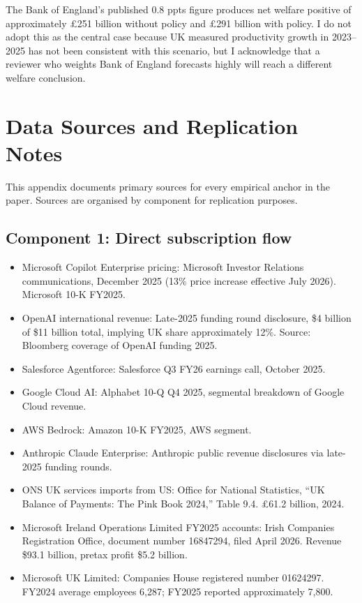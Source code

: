\documentclass[11pt,letterpaper]{article}
\theoremstyle{remark}
\begin{document}
The Bank of England's published 0.8 ppts figure produces net welfare positive of approximately \pounds251 billion without policy and \pounds291 billion with policy. I do not adopt this as the central case because UK measured productivity growth in 2023--2025 has not been consistent with this scenario, but I acknowledge that a reviewer who weights Bank of England forecasts highly will reach a different welfare conclusion.

\section{Data Sources and Replication Notes}

This appendix documents primary sources for every empirical anchor in the paper. Sources are organised by component for replication purposes.

\subsection{Component 1: Direct subscription flow}

\begin{itemize}
\item Microsoft Copilot Enterprise pricing: Microsoft Investor Relations communications, December 2025 (13\% price increase effective July 2026). Microsoft 10-K FY2025.
\item OpenAI international revenue: Late-2025 funding round disclosure, \$4 billion of \$11 billion total, implying UK share approximately 12\%. Source: Bloomberg coverage of OpenAI funding 2025.
\item Salesforce Agentforce: Salesforce Q3 FY26 earnings call, October 2025.
\item Google Cloud AI: Alphabet 10-Q Q4 2025, segmental breakdown of Google Cloud revenue.
\item AWS Bedrock: Amazon 10-K FY2025, AWS segment.
\item Anthropic Claude Enterprise: Anthropic public revenue disclosures via late-2025 funding rounds.
\item ONS UK services imports from US: Office for National Statistics, ``UK Balance of Payments: The Pink Book 2024,'' Table 9.4. \pounds61.2 billion, 2024.
\item Microsoft Ireland Operations Limited FY2025 accounts: Irish Companies Registration Office, document number 16847294, filed April 2026. Revenue \$93.1 billion, pretax profit \$5.2 billion.
\item Microsoft UK Limited: Companies House registered number 01624297. FY2024 average employees 6,287; FY2025 reported approximately 7,800.
\end{itemize}
\end{document}
